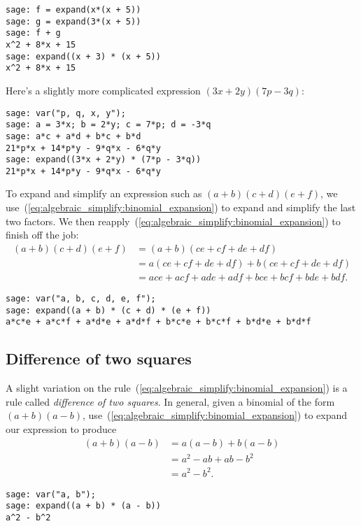 \begin{lstlisting}
sage: f = expand(x*(x + 5))
sage: g = expand(3*(x + 5))
sage: f + g
x^2 + 8*x + 15
sage: expand((x + 3) * (x + 5))
x^2 + 8*x + 15
\end{lstlisting}

Here's a slightly more complicated expression $(3x + 2y)(7p - 3q)$:

\begin{lstlisting}
sage: var("p, q, x, y");
sage: a = 3*x; b = 2*y; c = 7*p; d = -3*q
sage: a*c + a*d + b*c + b*d
21*p*x + 14*p*y - 9*q*x - 6*q*y
sage: expand((3*x + 2*y) * (7*p - 3*q))
21*p*x + 14*p*y - 9*q*x - 6*q*y
\end{lstlisting}

To expand and simplify an expression such as $(a + b) (c + d) (e + f)$,
we use~(\ref{eq:algebraic_simplify:binomial_expansion}) to expand and
simplify the last two factors. We then
reapply~(\ref{eq:algebraic_simplify:binomial_expansion}) to finish off
the job:
%
\begin{equation}
\begin{aligned}
(a + b) (c + d) (e + f)
&=
(a + b) (ce + cf + de + df) \\
&=
a(ce + cf + de + df) + b(ce + cf + de + df) \\
&=
ace + acf + ade + adf + bce + bcf + bde + bdf.
\end{aligned}
\end{equation}

\begin{lstlisting}
sage: var("a, b, c, d, e, f");
sage: expand((a + b) * (c + d) * (e + f))
a*c*e + a*c*f + a*d*e + a*d*f + b*c*e + b*c*f + b*d*e + b*d*f
\end{lstlisting}



\subsection{Difference of two squares}

A slight variation on the
rule~(\ref{eq:algebraic_simplify:binomial_expansion}) is a rule called
\emph{difference of two squares}. In
general, given a binomial of the form $(a + b)(a - b)$,
use~(\ref{eq:algebraic_simplify:binomial_expansion}) to expand our
expression to produce
%
\begin{equation}
\label{eq:algebraic_simplify:difference_of_two_squares}
\begin{aligned}
(a + b)(a - b)
&=
a(a - b) + b(a - b) \\
&=
a^2 - ab + ab - b^2 \\
&=
a^2 - b^2.
\end{aligned}
\end{equation}
%
\begin{lstlisting}
sage: var("a, b");
sage: expand((a + b) * (a - b))
a^2 - b^2
\end{lstlisting}

